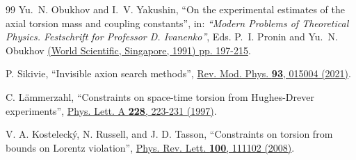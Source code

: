 \documentclass[12pt,prd,showkeys,amsmath,amssymb,nofootinbib]{revtex4-1}
\begin{document}
\begin{thebibliography}{99}
Yu.~N. Obukhov and  I.~V. Yakushin,
``On the experimental estimates of the axial torsion mass and coupling constants'',
in: {\it ``Modern Problems of Theoretical Physics. Festschrift for Professor D. Ivanenko''},
Eds. P.~I. Pronin and Yu.~N. Obukhov
\href{https://doi.org/10.1142/9789814368148_0011}{(World Scientific, Singapore, 1991) pp. 197-215}. 

P. Sikivie, ``Invisible axion search methods'',
\href{https://doi.org/10.1103/RevModPhys.93.015004}{Rev. Mod. Phys. {\bf 93}, 015004 (2021)}.

C. L\"ammerzahl, ``Constraints on space-time torsion from Hughes-Drever experiments'',
\href{https://doi.org/10.1016/S0375-9601(97)00127-8}{Phys. Lett. A {\bf 228}, 223-231 (1997)}.

V. A. Kosteleck\'y, N. Russell, and J. D. Tasson, ``Constraints on torsion from bounds on Lorentz violation'',
\href{https://doi.org/10.1103/PhysRevLett.100.111102}{Phys. Rev. Lett. {\bf 100}, 111102 (2008)}.
  
\end{thebibliography}
\end{document}
